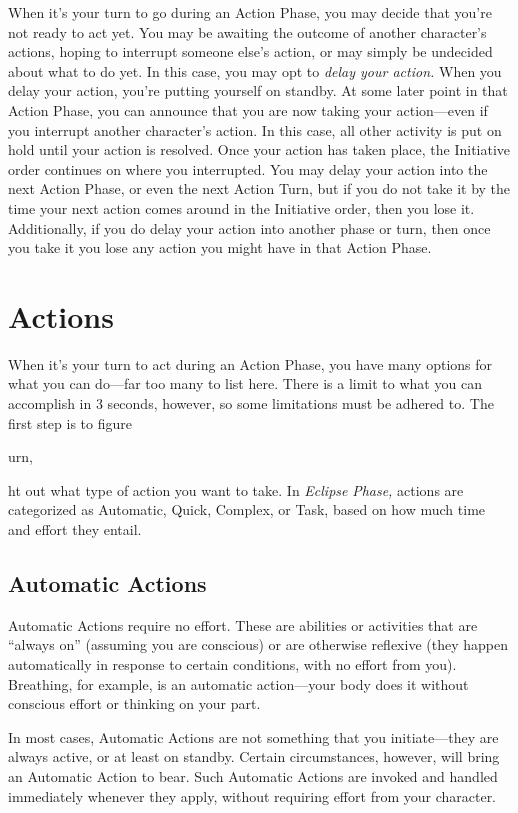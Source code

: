 When it's your turn to go during an Action Phase, 
you may decide that you're not ready to act yet. You 
may be awaiting the outcome of another character's 
actions, hoping to interrupt someone else's action, or 
may simply be undecided about what to do yet. In this 
case, you may opt to \textit{delay your action.}
When you delay your action, you're putting yourself
on standby. At some later point in that Action
Phase, you can announce that you are now taking 
your action—even if you interrupt another character's 
action. In this case, all other activity is put on hold 
until your action is resolved. Once your action has 
taken place, the Initiative order continues on where 
you interrupted.
You may delay your action into the next Action 
Phase, or even the next Action Turn, but if you do not 
take it by the time your next action comes around in 
the Initiative order, then you lose it. Additionally, if 
you do delay your action into another phase or turn, 
then once you take it you lose any action you might 
have in that Action Phase.

\section{Actions}

When it's your turn to act during an Action Phase, 
you have many options for what you can do—far too 
many to list here. There is a limit to what you can 
accomplish in 3 seconds, however, so some limitations
must be adhered to. The first step is to figure

urn, 

ht 
out what type of action you want to take. In \textit{Eclipse }
\textit{Phase,} actions are categorized as Automatic, Quick, 
Complex, or Task, based on how much time and 
effort they entail.

\subsection{Automatic Actions}

Automatic Actions require no effort. These are abilities
or activities that are ``always on'' (assuming you
are conscious) or are otherwise reflexive (they happen 
automatically in response to certain conditions, with 
no effort from you). Breathing, for example, is an automatic
action—your body does it without conscious
effort or thinking on your part.

In most cases, Automatic Actions are not something 
that you initiate—they are always active, or at least 
on standby. Certain circumstances, however, will bring 
an Automatic Action to bear. Such Automatic Actions 
are invoked and handled immediately whenever they 
apply, without requiring effort from your character.

